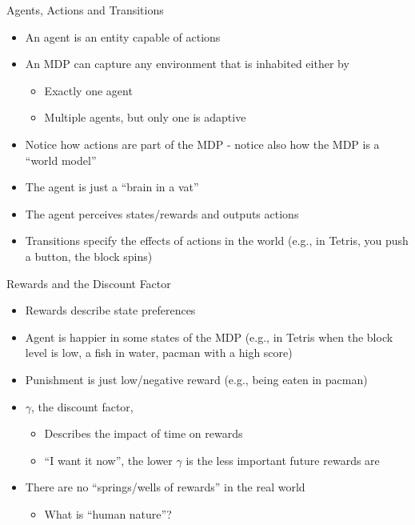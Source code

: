 \documentclass[]{beamer}
\providecommand{\tightlist}{%
  \setlength{\itemsep}{0pt}\setlength{\parskip}{0pt}}
\begin{document}
\begin{frame}{Agents, Actions and Transitions}

\begin{itemize}
\tightlist
\item
  An agent is an entity capable of actions
\item
  An MDP can capture any environment that is inhabited either by

  \begin{itemize}
  \tightlist
  \item
    Exactly one agent
  \item
    Multiple agents, but only one is adaptive
  \end{itemize}
\item
  Notice how actions are part of the MDP - notice also how the MDP is a
  ``world model''
\item
  The agent is just a ``brain in a vat''
\item
  The agent perceives states/rewards and outputs actions
\item
  Transitions specify the effects of actions in the world (e.g., in
  Tetris, you push a button, the block spins)
\end{itemize}

\end{frame}

\begin{frame}{Rewards and the Discount Factor}

\begin{itemize}
\tightlist
\item
  Rewards describe state preferences
\item
  Agent is happier in some states of the MDP (e.g., in Tetris when the
  block level is low, a fish in water, pacman with a high score)
\item
  Punishment is just low/negative reward (e.g., being eaten in pacman)
\item
  \(\gamma\), the discount factor,

  \begin{itemize}
  \tightlist
  \item
    Describes the impact of time on rewards
  \item
    ``I want it now'', the lower \(\gamma\) is the less important future
    rewards are
  \end{itemize}
\item
  There are no ``springs/wells of rewards'' in the real world

  \begin{itemize}
  \tightlist
  \item
    What is ``human nature''?
  \end{itemize}
\end{itemize}

\end{frame}
\end{document}
